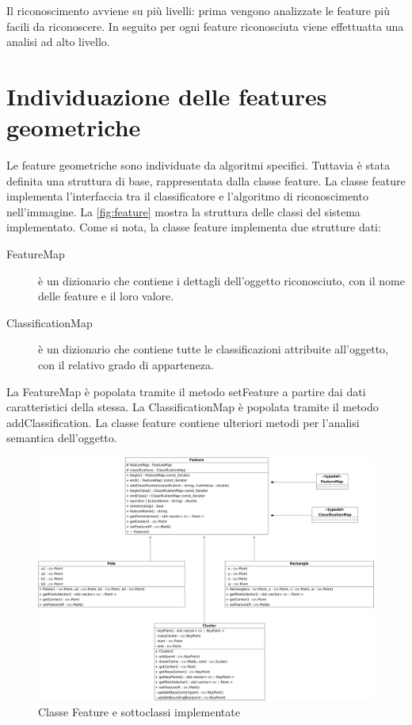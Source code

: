 Il riconoscimento avviene su più livelli: prima vengono analizzate le feature più facili da riconoscere. In seguito per ogni feature riconosciuta viene effettuatta una analisi ad alto livello.

\section{Individuazione delle features geometriche}

Le feature geometriche sono individuate da algoritmi specifici. Tuttavia è stata definita una struttura di base, rappresentata dalla classe feature. La classe feature implementa l'interfaccia tra il classificatore e l'algoritmo di riconoscimento nell'immagine.
La \autoref{fig:feature} mostra la struttura delle classi del sistema implementato. Come si nota, la classe feature implementa due strutture dati:

\begin{description}
 \item [FeatureMap] è un dizionario che contiene i dettagli dell'oggetto riconosciuto, con il nome delle feature e il loro valore.
 \item [ClassificationMap] è un dizionario che contiene tutte le classificazioni attribuite all'oggetto, con il relativo grado di apparteneza.
\end{description}

La FeatureMap è popolata tramite il metodo setFeature a partire dai dati caratteristici della stessa.
La ClassificationMap è popolata tramite il metodo addClassification. La classe feature contiene ulteriori metodi per l'analisi semantica dell'oggetto.

\begin{figure}[ht]
  \includegraphics[width=\textwidth]{diagrammi/Feature}
  \caption{Classe Feature e sottoclassi implementate}
  \label{fig:feature}
\end{figure}


